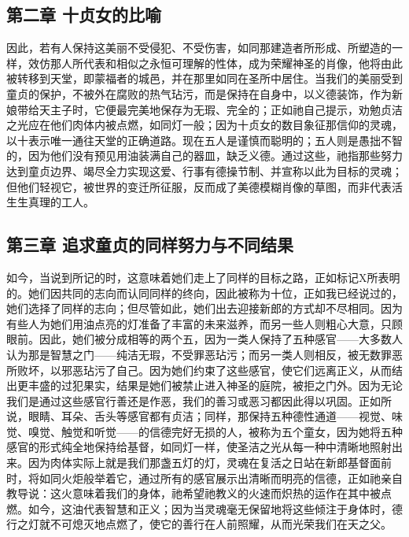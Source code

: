 
\subsection{第二章 十贞女的比喻}

因此，若有人保持这美丽不受侵犯、不受伤害，如同那建造者所形成、所塑造的一样，效仿那人所代表和相似之永恒可理解的性体，成为荣耀神圣的肖像，他将由此被转移到天堂，即蒙福者的城邑，并在那里如同在圣所中居住。当我们的美丽受到童贞的保护，不被外在腐败的热气玷污，而是保持在自身中，以义德装饰，作为新娘带给天主子时，它便最完美地保存为无瑕、完全的；正如祂自己提示，劝勉贞洁之光应在他们肉体内被点燃，如同灯一般；因为十贞女的数目象征那信仰的灵魂，以十表示唯一通往天堂的正确道路。现在五人是谨慎而聪明的；五人则是愚拙不智的，因为他们没有预见用油装满自己的器皿，缺乏义德。通过这些，祂指那些努力达到童贞边界、竭尽全力实现这爱、行事有德操节制、并宣称以此为目标的灵魂；但他们轻视它，被世界的变迁所征服，反而成了美德模糊肖像的草图，而非代表活生生真理的工人。\par


\subsection{第三章 追求童贞的同样努力与不同结果}

如今，当说到所记的时，这意味着她们走上了同样的目标之路，正如标记X所表明的。她们因共同的志向而认同同样的终向，因此被称为十位，正如我已经说过的，她们选择了同样的志向；但尽管如此，她们出去迎接新郎的方式却不尽相同。因为有些人为她们用油点亮的灯准备了丰富的未来滋养，而另一些人则粗心大意，只顾眼前。因此，她们被分成相等的两个五，因为一类人保持了五种感官——大多数人认为那是智慧之门——纯洁无瑕，不受罪恶玷污；而另一类人则相反，被无数罪恶所败坏，以邪恶玷污了自己。因为她们约束了这些感官，使它们远离正义，从而结出更丰盛的过犯果实，结果是她们被禁止进入神圣的庭院，被拒之门外。因为无论我们是通过这些感官行善还是作恶，我们的善习或恶习都因此得以巩固。正如所说，眼睛、耳朵、舌头等感官都有贞洁；同样，那保持五种德性通道——视觉、味觉、嗅觉、触觉和听觉——的信德完好无损的人，被称为五个童女，因为她将五种感官的形式纯全地保持给基督，如同灯一样，使圣洁之光从每一种中清晰地照射出来。因为肉体实际上就是我们那盏五灯的灯，灵魂在复活之日站在新郎基督面前时，将如同火炬般举着它，通过所有的感官展示出清晰而明亮的信德，正如祂亲自教导说：这火意味着我们的身体，祂希望祂教义的火速而炽热的运作在其中被点燃。如今，这油代表智慧和正义；因为当灵魂毫无保留地将这些倾注于身体时，德行之灯就不可熄灭地点燃了，使它的善行在人前照耀，从而光荣我们在天之父。\par

